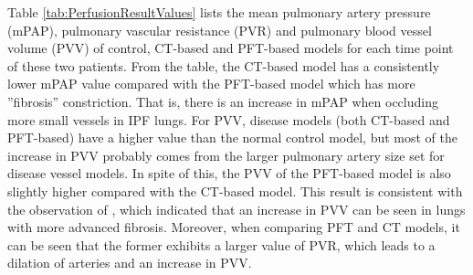 Table \ref{tab:PerfusionResultValues} lists the mean pulmonary artery pressure (mPAP), pulmonary vascular resistance (PVR) and pulmonary blood vessel volume (PVV) of control, CT-based and PFT-based models for each time point of these two patients. From the table, the CT-based model has a consistently lower mPAP value compared with the PFT-based model which has more ''fibrosis'' constriction. That is, there is an increase in mPAP when occluding more small vessels in IPF lungs. For PVV, disease models (both CT-based and PFT-based) have a higher value than the normal control model, but most of the increase in PVV probably comes from the larger pulmonary artery size set for disease vessel models. In spite of this, the PVV of the PFT-based model is also slightly higher compared with the CT-based model. This result is consistent with the observation of \cite{Jacob2016Mortality, Jacob2016Evaluation}, which indicated that an increase in PVV can be seen in lungs with more advanced fibrosis. Moreover, when comparing PFT and CT models, it can be seen that the former exhibits a larger value of PVR, which leads to a dilation of arteries and an increase in PVV.

